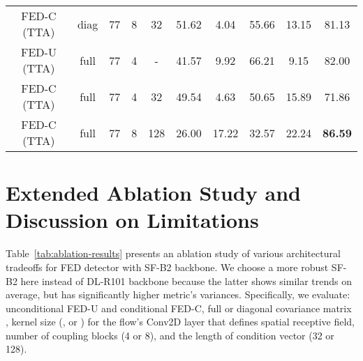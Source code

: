 \documentclass[accepted, startpage]{uai2023}
\begin{document}
\begin{table*}[ht]
\begin{tabular}{c|c|c|c|c|cc|cc|c}
		FED-C (TTA) & diag & 77  & 8 &  32 &          51.62 &           4.04 &          55.66 &         13.15  &         81.13 \\
		FED-U (TTA) & full & 77  & 4 &  -  &          41.57 &           9.92 &          66.21 &          9.15  &         82.00 \\
		FED-C (TTA) & full & 77 & 4 &  32 &          49.54 &           4.63 &          50.65 &         15.89  &         71.86 \\
		FED-C (TTA) & full & 77  & 8 & 128 &          26.00 &          17.22 &          32.57 &         22.24  & \textbf{86.59} \\
		\bottomrule
	\end{tabular}
\end{table*}

\section{Extended Ablation Study and Discussion on Limitations}
\label{subsec:app_ablation}

Table~\ref{tab:ablation-results} presents an ablation study of various architectural tradeoffs for FED detector with SF-B2 backbone. We choose a more robust SF-B2 here instead of DL-R101 backbone because the latter shows similar trends on average, but has significantly higher metric's variances. Specifically, we evaluate: unconditional FED-U and conditional FED-C, full or diagonal covariance matrix , kernel size  (,  or ) for the flow's Conv2D layer that defines spatial receptive field, number of coupling blocks  (4 or 8), and the length  of condition vector  (32 or 128).
\end{document}
